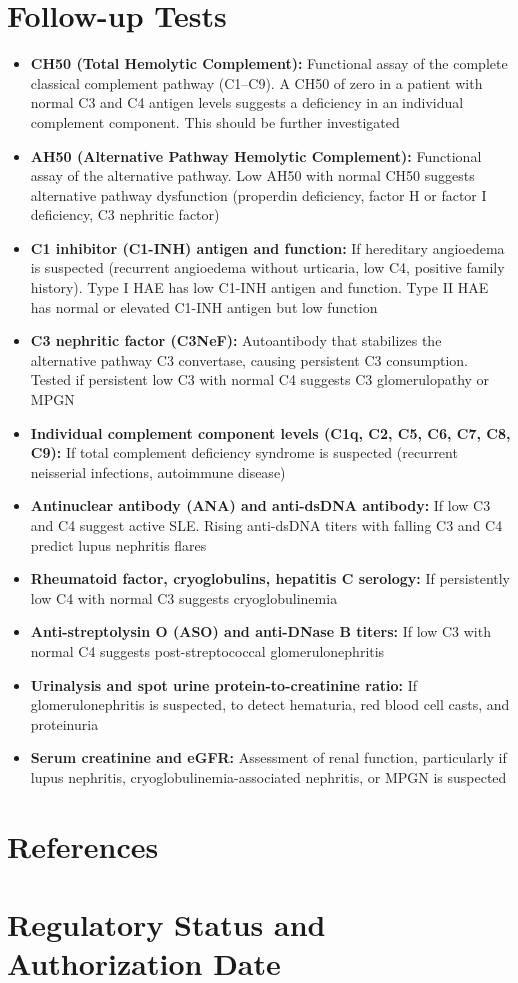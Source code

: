 \section*{Follow-up Tests}
\begin{itemize}
  \item \textbf{CH50 (Total Hemolytic Complement):} Functional assay of the complete classical complement pathway (C1--C9). A CH50 of zero in a patient with normal C3 and C4 antigen levels suggests a deficiency in an individual complement component. This should be further investigated
  \item \textbf{AH50 (Alternative Pathway Hemolytic Complement):} Functional assay of the alternative pathway. Low AH50 with normal CH50 suggests alternative pathway dysfunction (properdin deficiency, factor H or factor I deficiency, C3 nephritic factor)
  \item \textbf{C1 inhibitor (C1-INH) antigen and function:} If hereditary angioedema is suspected (recurrent angioedema without urticaria, low C4, positive family history). Type I HAE has low C1-INH antigen and function. Type II HAE has normal or elevated C1-INH antigen but low function
  \item \textbf{C3 nephritic factor (C3NeF):} Autoantibody that stabilizes the alternative pathway C3 convertase, causing persistent C3 consumption. Tested if persistent low C3 with normal C4 suggests C3 glomerulopathy or MPGN
  \item \textbf{Individual complement component levels (C1q, C2, C5, C6, C7, C8, C9):} If total complement deficiency syndrome is suspected (recurrent neisserial infections, autoimmune disease)
  \item \textbf{Antinuclear antibody (ANA) and anti-dsDNA antibody:} If low C3 and C4 suggest active SLE. Rising anti-dsDNA titers with falling C3 and C4 predict lupus nephritis flares
  \item \textbf{Rheumatoid factor, cryoglobulins, hepatitis C serology:} If persistently low C4 with normal C3 suggests cryoglobulinemia
  \item \textbf{Anti-streptolysin O (ASO) and anti-DNase B titers:} If low C3 with normal C4 suggests post-streptococcal glomerulonephritis
  \item \textbf{Urinalysis and spot urine protein-to-creatinine ratio:} If glomerulonephritis is suspected, to detect hematuria, red blood cell casts, and proteinuria
  \item \textbf{Serum creatinine and eGFR:} Assessment of renal function, particularly if lupus nephritis, cryoglobulinemia-associated nephritis, or MPGN is suspected
\end{itemize}

\section*{References}



\clearpage
\section*{Regulatory Status and Authorization Date}

\clearpage
